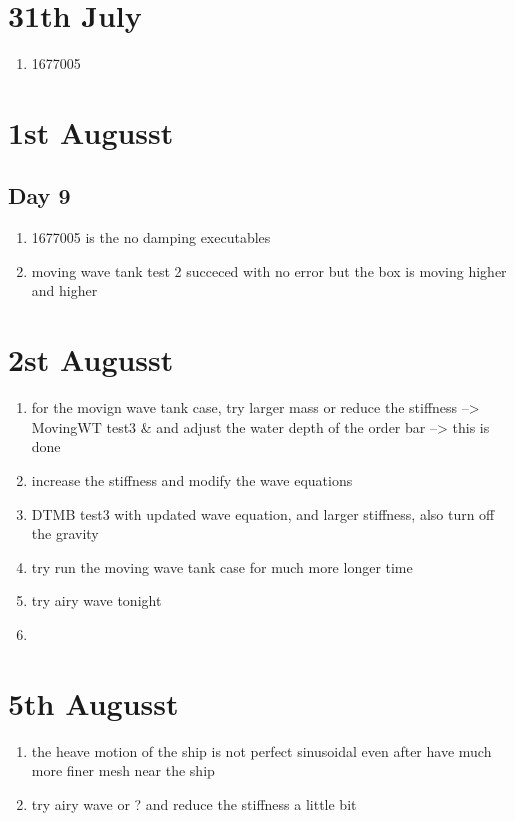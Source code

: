 \documentclass[12pt]{article} %
\begin{document}
\section{31th July}

\begin{enumerate}
    \item 1677005
\end{enumerate}
\section{1st Augusst}
\subsection{Day 9}
\begin{enumerate}
    \item 1677005 is the no damping executables
    \item moving wave tank test 2 succeced with no error but the box is moving higher and higher
\end{enumerate}
\section{2st Augusst}

\begin{enumerate}
     \item for the movign wave tank case, try larger mass or reduce the stiffness --> MovingWT test3 \& and adjust the water depth of the order bar --> this is done
     \item increase the stiffness and modify the wave equations
    \item  DTMB test3 with updated wave equation, and larger stiffness, also turn off the gravity
    \item try run the moving wave tank case for much more longer time
    \item try airy wave tonight
    \item 
\end{enumerate}
\section{5th Augusst}

\begin{enumerate}
    \item the heave motion of the ship is not perfect sinusoidal even after have much more finer mesh near the ship
    \item try airy wave or ? and reduce the stiffness a little bit
\end{enumerate} 
    
\end{document}
